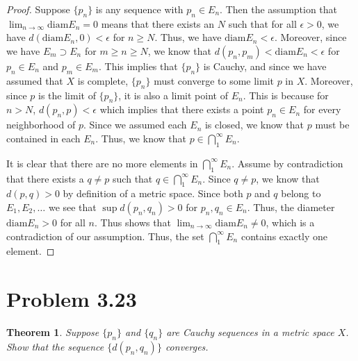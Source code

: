 \documentclass[psamsfonts]{amsart}
\newtheorem{thm}{Theorem}[section]
\theoremstyle{definition}
\theoremstyle{remark}
\numberwithin{equation}{section}
\begin{document}
\begin{proof}
Suppose $\{ p_n \}$ is any sequence with $p_n \in E_n$. Then the assumption that $\lim_{n \to \infty} \text{diam} E_n = 0$ means that there exists an $N$ such that for all $\epsilon > 0$, we have $d(\text{diam} {E_n},0) < \epsilon$ for $n \geq N$. Thus, we have $\text{diam} E_n < \epsilon$. Moreover, since we have $E_m \supset E_n$ for $m \geq n \geq N$, we know that $ d(p_n, p_m) < \text{diam} E_n < \epsilon $ for $p_n \in E_n$ and $p_m \in E_m$. This implies that $\{ p_n \}$ is Cauchy, and since we have assumed that $X$ is complete, $\{ p_n \}$ must converge to some limit $p$ in $X$. Moreover, since $p$ is the limit of $\{ p_n \}$, it is also a limit point of $ E_n$. This is because for $n > N$, $ d(p_n, p) < \epsilon $ which implies that there exists a point $p_n \in E_n$ for every neighborhood of $p$. Since we assumed each $E_n$ is closed, we know that $p$ must be contained in each $E_n$. Thus, we know that $ p \in \bigcap_1^\infty E_n$.

It is clear that there are no more elements in  $\bigcap_1^\infty E_n$. Assume by contradiction that there exists a $q \neq p$ such that $q \in \bigcap_1^\infty E_n $. Since $q \neq p$, we know that $d(p,q) > 0$ by definition of a metric space. Since both $p$ and $q$ belong to $E_1, E_2, \ldots$ we see that $ \sup d(p_n,q_n) > 0$ for $p_n, q_n \in E_n$. Thus, the diameter $\text{diam} E_n > 0$ for all $n$. Thus shows that $\lim_{n \to \infty} \text{diam} E_n \neq 0$, which is a contradiction of our assumption. Thus, the set $\bigcap_1^\infty E_n$ contains exactly one element.
\end{proof}

\section{Problem 3.23}

\begin{thm}
Suppose $\{ p_n \}$ and $\{ q_n \}$ are Cauchy sequences in a metric space $X$. Show that the sequence $\{ d(p_n, q_n) \}$ converges. 
\end{thm}
\end{document}

